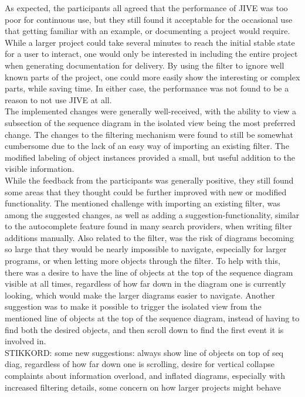 As expected, the participants all agreed that the performance of JIVE was too poor for continuous use, but they still found it acceptable for the occasional use that getting familiar with an example, or documenting a project would require.
While a larger project could take several minutes to reach the initial stable state for a user to interact, one would only be interested in including the entire project when generating documentation for delivery.
By using the filter to ignore well known parts of the project, one could more easily show the interesting or complex parts, while saving time.
In either case, the performance was not found to be a reason to not use JIVE at all.
~\\

The implemented changes were generally well-received, with the ability to view a subsection of the sequence diagram in the isolated view being the most preferred change.
The changes to the filtering mechanism were found to still be somewhat cumbersome due to the lack of an easy way of importing an existing filter.
The modified labeling of object instances provided a small, but useful addition to the visible information.
~\\

While the feedback from the participants was generally positive, they still found some areas that they thought could be further improved with new or modified functionality.
The mentioned challenge with importing an existing filter, was among the suggested changes, as well as adding a suggestion-functionality, similar to the autocomplete feature found in many search providers, when writing filter additions manually.
Also related to the filter, was the risk of diagrams  becoming so large that they would be nearly impossible to navigate, especially for larger programs, or when letting more objects through the filter.
To help with this, there was a desire to have the line of objects at the top of the sequence diagram visible at all times, regardless of how far down in the diagram one is currently looking, which would make the larger diagrams easier to navigate.
Another suggestion was to make it possible to trigger the isolated view from the mentioned line of objects at the top of the sequence diagram, instead of having to find both the desired objects, and then scroll down to find the first event it is involved in.
~\\


STIKKORD: some new suggestions: always show line of objects on top of seq diag, regardless of how far down one is scrolling, desire for vertical collapse
complaints about information overload, and inflated diagrams, especially with increased filtering details, some concern on how larger projects might behave

